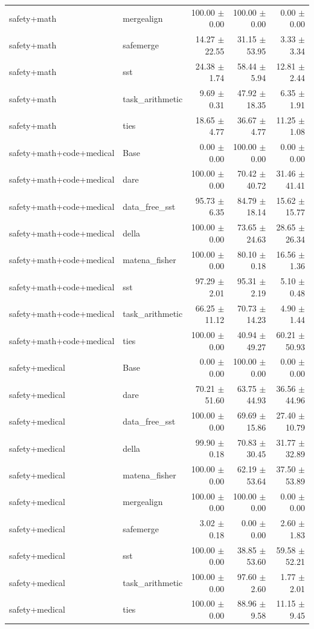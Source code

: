 \begin{table}[H]
{\begin{tabular}{llrrr}
safety+math & mergealign & 100.00 $\pm$ 0.00 & 100.00 $\pm$ 0.00 & 0.00 $\pm$ 0.00 \\
safety+math & safemerge & 14.27 $\pm$ 22.55 & 31.15 $\pm$ 53.95 & 3.33 $\pm$ 3.34 \\
safety+math & sst & 24.38 $\pm$ 1.74 & 58.44 $\pm$ 5.94 & 12.81 $\pm$ 2.44 \\
safety+math & task\_arithmetic & 9.69 $\pm$ 0.31 & 47.92 $\pm$ 18.35 & 6.35 $\pm$ 1.91 \\
safety+math & ties & 18.65 $\pm$ 4.77 & 36.67 $\pm$ 4.77 & 11.25 $\pm$ 1.08 \\
safety+math+code+medical & Base & 0.00 $\pm$ 0.00 & 100.00 $\pm$ 0.00 & 0.00 $\pm$ 0.00 \\
safety+math+code+medical & dare & 100.00 $\pm$ 0.00 & 70.42 $\pm$ 40.72 & 31.46 $\pm$ 41.41 \\
safety+math+code+medical & data\_free\_sst & 95.73 $\pm$ 6.35 & 84.79 $\pm$ 18.14 & 15.62 $\pm$ 15.77 \\
safety+math+code+medical & della & 100.00 $\pm$ 0.00 & 73.65 $\pm$ 24.63 & 28.65 $\pm$ 26.34 \\
safety+math+code+medical & matena\_fisher & 100.00 $\pm$ 0.00 & 80.10 $\pm$ 0.18 & 16.56 $\pm$ 1.36 \\
safety+math+code+medical & sst & 97.29 $\pm$ 2.01 & 95.31 $\pm$ 2.19 & 5.10 $\pm$ 0.48 \\
safety+math+code+medical & task\_arithmetic & 66.25 $\pm$ 11.12 & 70.73 $\pm$ 14.23 & 4.90 $\pm$ 1.44 \\
safety+math+code+medical & ties & 100.00 $\pm$ 0.00 & 40.94 $\pm$ 49.27 & 60.21 $\pm$ 50.93 \\
safety+medical & Base & 0.00 $\pm$ 0.00 & 100.00 $\pm$ 0.00 & 0.00 $\pm$ 0.00 \\
safety+medical & dare & 70.21 $\pm$ 51.60 & 63.75 $\pm$ 44.93 & 36.56 $\pm$ 44.96 \\
safety+medical & data\_free\_sst & 100.00 $\pm$ 0.00 & 69.69 $\pm$ 15.86 & 27.40 $\pm$ 10.79 \\
safety+medical & della & 99.90 $\pm$ 0.18 & 70.83 $\pm$ 30.45 & 31.77 $\pm$ 32.89 \\
safety+medical & matena\_fisher & 100.00 $\pm$ 0.00 & 62.19 $\pm$ 53.64 & 37.50 $\pm$ 53.89 \\
safety+medical & mergealign & 100.00 $\pm$ 0.00 & 100.00 $\pm$ 0.00 & 0.00 $\pm$ 0.00 \\
safety+medical & safemerge & 3.02 $\pm$ 0.18 & 0.00 $\pm$ 0.00 & 2.60 $\pm$ 1.83 \\
safety+medical & sst & 100.00 $\pm$ 0.00 & 38.85 $\pm$ 53.60 & 59.58 $\pm$ 52.21 \\
safety+medical & task\_arithmetic & 100.00 $\pm$ 0.00 & 97.60 $\pm$ 2.60 & 1.77 $\pm$ 2.01 \\
safety+medical & ties & 100.00 $\pm$ 0.00 & 88.96 $\pm$ 9.58 & 11.15 $\pm$ 9.45 \\
\bottomrule
\end{tabular}
}
\end{table}